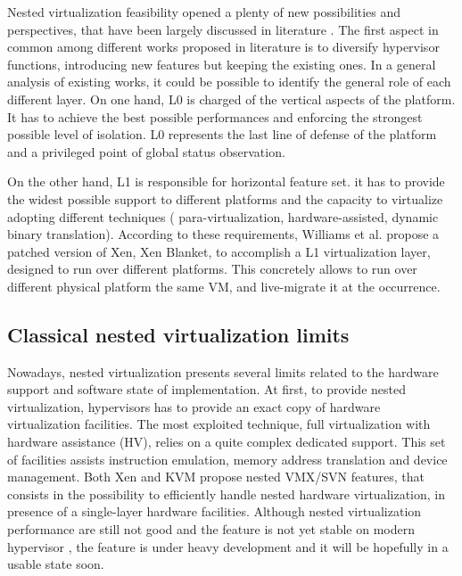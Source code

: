 \documentclass{sig-alternate}
\begin{document}
Nested virtualization feasibility opened a plenty of new possibilities and perspectives, that have been largely discussed in literature \cite{rec:virt,turtles:ibm,art:blan}. The first aspect in common among different works proposed in literature is to diversify hypervisor functions, introducing new features but keeping the existing ones. In a general analysis of existing works, it could be possible to identify the general role of each different layer.
On one hand, L0 is charged of the vertical aspects of the platform. It has to achieve  the best possible performances and enforcing the strongest possible level of isolation. L0 represents the last line of defense of the platform and a privileged point of global status observation.

On the other hand, L1 is responsible for horizontal feature set. it has to provide the widest possible support to different platforms and the capacity to virtualize adopting different techniques ( para-virtualization, hardware-assisted, dynamic binary translation). According to these requirements, Williams et al. \cite{art:blan} propose a patched version of Xen, Xen Blanket, to accomplish a L1 virtualization layer, designed to run over different platforms. This concretely allows to run over different physical platform the same VM, and live-migrate it at the occurrence.

\subsection{Classical nested virtualization limits}

Nowadays, nested virtualization presents several limits related to the hardware support and software state of implementation. At first, to provide nested virtualization, hypervisors has to provide an exact copy of hardware virtualization facilities. The most exploited technique, full virtualization with hardware assistance (HV), relies on a quite complex dedicated support.
This set of facilities assists instruction emulation, memory address translation and device management. Both Xen and KVM propose nested VMX/SVN features, that consists in the possibility to efficiently handle nested hardware virtualization, in presence of a single-layer hardware facilities.
Although nested virtualization performance are still not good and the feature is not yet stable on modern hypervisor \cite{xen:test}, the feature is under heavy development and it will be hopefully in a usable state soon.
\end{document}
